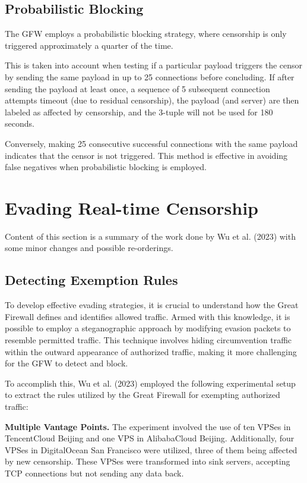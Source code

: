 \subsection{Probabilistic Blocking}
The GFW employs a probabilistic blocking strategy, where censorship is only triggered approximately a quarter of the time.

This is taken into account when testing if a particular payload triggers the censor by sending the same payload in up to 25 connections before concluding. If after sending the payload at least once, a sequence of 5 subsequent connection attempts timeout (due to residual censorship), the payload (and server) are then labeled as affected by censorship, and the 3-tuple will not be used for 180 seconds. 

Conversely, making 25 consecutive successful connections with the same payload indicates that the censor is not triggered. This method is effective in avoiding false negatives when probabilistic blocking is employed.\cite{wu2023great}

\section{Evading Real-time Censorship}
Content of this section is a summary of the work done by Wu et al. (2023) with some minor changes and possible re-orderings.\cite{wu2023great}

\subsection{Detecting Exemption Rules}
To develop effective evading strategies, it is crucial to understand how the Great Firewall defines and identifies allowed traffic. Armed with this knowledge, it is possible to employ a steganographic approach by modifying evasion packets to resemble permitted traffic. This technique involves hiding circumvention traffic within the outward appearance of authorized traffic, making it more challenging for the GFW to detect and block. 

To accomplish this, Wu et al. (2023) employed the following experimental setup to extract the rules utilized by the Great Firewall for exempting authorized traffic:

\textbf{Multiple Vantage Points.} The experiment involved the use of ten VPSes in TencentCloud Beijing and one VPS in AlibabaCloud Beijing. Additionally, four VPSes in DigitalOcean San Francisco were utilized, three of them being affected by new censorship. These VPSes were transformed into sink servers, accepting TCP connections but not sending any data back.

